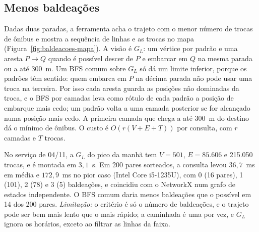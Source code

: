 \subsection{Menos baldeações}\label{sec:F-BALD}

Dadas duas paradas, a ferramenta acha o trajeto com o menor número de trocas de ônibus e mostra
a sequência de linhas e as trocas no mapa (Figura~\ref{fig:baldeacoes-mapa}). A visão é $G_L$:
um vértice por padrão e uma aresta $P \to Q$ quando é possível descer de $P$ e embarcar em $Q$
na mesma parada ou a até 300~m. Um BFS comum sobre $G_L$ só dá um limite inferior, porque os
padrões têm sentido: quem embarca em $P$ na décima parada não pode usar uma troca na terceira.
Por isso cada aresta guarda as posições não dominadas da troca, e o BFS por camadas leva como
rótulo de cada padrão a posição de embarque mais cedo; um padrão volta a uma camada posterior
se for alcançado numa posição mais cedo. A primeira camada que chega a até 300~m do destino dá
o mínimo de ônibus. O custo é $O(r(V + E + T))$ por consulta, com $r$ camadas e $T$ trocas.

No serviço de 04/11, a $G_L$ do pico da manhã tem $V = 501$, $E = 85.606$ e 215.050 trocas, e é
montada em $3{,}1$~s. Em 200 pares sorteados, a consulta levou $36{,}7$~ms em média e
$172{,}9$~ms no pior caso (Intel Core i5-1235U), com 0 (16 pares), 1 (101), 2 (78) e 3 (5)
baldeações, e coincidiu com o NetworkX num grafo de estados independente. O BFS comum daria
menos baldeações que o possível em 14 dos 200 pares. \emph{Limitação:} o critério é só o
número de baldeações, e o trajeto pode ser bem mais lento que o mais rápido; a caminhada é uma
por vez, e $G_L$ ignora os horários, exceto ao filtrar as linhas da faixa.
